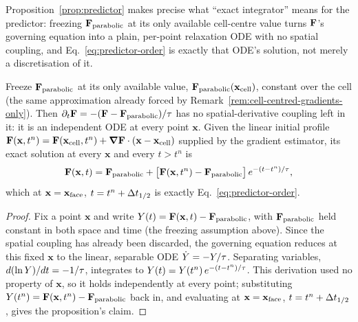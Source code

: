 Proposition~\ref{prop:predictor} makes precise what ``exact integrator''
means for the predictor: freezing $\mathbf{F}_{\rm parabolic}$ at its only
available cell-centre value turns $\mathbf{F}$'s governing equation into a
plain, per-point relaxation ODE with no spatial coupling, and
Eq.~\eqref{eq:predictor-order} is exactly that ODE's solution, not merely
a discretisation of it.
\begin{proposition}
\label{prop:predictor}
Freeze $\mathbf{F}_{\rm parabolic}$ at its only available value,
$\mathbf{F}_{\rm parabolic}(\mathbf x_{\rm cell})$, constant over the cell
(the same approximation already forced by
Remark~\ref{rem:cell-centred-gradients-only}). Then
$\partial_t\mathbf{F}=-(\mathbf{F}-\mathbf{F}_{\rm parabolic})/\tau$ has no
spatial-derivative coupling left in it: it is an independent ODE at
every point $\mathbf x$. Given the linear initial profile
$\mathbf{F}(\mathbf x,t^n)=\mathbf{F}(\mathbf x_{\rm cell},t^n)+\grad\mathbf{F}\cdot(\mathbf x-\mathbf x_{\rm cell})$
supplied by the gradient estimator, its exact solution at every
$\mathbf x$ and every $t>t^n$ is
\begin{equation}
  \mathbf{F}(\mathbf x,t) = \mathbf{F}_{\rm parabolic} +
  \big[\mathbf{F}(\mathbf x,t^n)-\mathbf{F}_{\rm parabolic}\big]\,e^{-(t-t^n)/\tau} ,
\end{equation}
which at $\mathbf x=\mathbf x_{\rm face}$, $t=t^n+\Delta t_{1/2}$ is exactly
Eq.~\eqref{eq:predictor-order}.
\end{proposition}
\begin{proof}
Fix a point $\mathbf x$ and write $Y(t)=\mathbf{F}(\mathbf x,t)-\mathbf{F}_{\rm parabolic}$,
with $\mathbf{F}_{\rm parabolic}$ held constant in both space and time (the
freezing assumption above). Since the spatial coupling has already been
discarded, the governing equation reduces at this fixed $\mathbf x$ to
the linear, separable ODE $\dot Y=-Y/\tau$. Separating variables,
$d(\ln Y)/dt=-1/\tau$, integrates to
$Y(t)=Y(t^n)\,e^{-(t-t^n)/\tau}$. This derivation used no property
of $\mathbf x$, so it holds independently at every point; substituting
$Y(t^n)=\mathbf{F}(\mathbf x,t^n)-\mathbf{F}_{\rm parabolic}$ back in, and
evaluating at $\mathbf x=\mathbf x_{\rm face}$, $t=t^n+\Delta t_{1/2}$, gives the
proposition's claim.
\end{proof}

